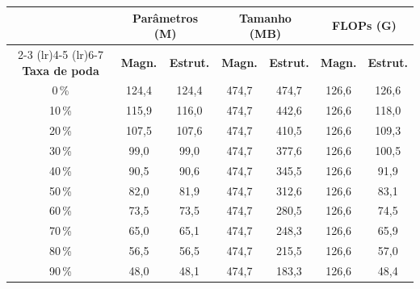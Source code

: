 \begin{tabular}{c cc cc cc}
\toprule
& \multicolumn{2}{c}{\textbf{Parâmetros (M)}} & \multicolumn{2}{c}{\textbf{Tamanho (MB)}} & \multicolumn{2}{c}{\textbf{FLOPs (G)}} \\
\cmidrule(lr){2-3} \cmidrule(lr){4-5} \cmidrule(lr){6-7}
\textbf{Taxa de poda} & \textbf{Magn.} & \textbf{Estrut.} & \textbf{Magn.} & \textbf{Estrut.} & \textbf{Magn.} & \textbf{Estrut.} \\
\midrule
0\,\% & 124,4 & 124,4 & 474,7 & 474,7 & 126,6 & 126,6 \\
10\,\% & 115,9 & 116,0 & 474,7 & 442,6 & 126,6 & 118,0 \\
20\,\% & 107,5 & 107,6 & 474,7 & 410,5 & 126,6 & 109,3 \\
30\,\% & 99,0 & 99,0 & 474,7 & 377,6 & 126,6 & 100,5 \\
40\,\% & 90,5 & 90,6 & 474,7 & 345,5 & 126,6 & 91,9 \\
50\,\% & 82,0 & 81,9 & 474,7 & 312,6 & 126,6 & 83,1 \\
60\,\% & 73,5 & 73,5 & 474,7 & 280,5 & 126,6 & 74,5 \\
70\,\% & 65,0 & 65,1 & 474,7 & 248,3 & 126,6 & 65,9 \\
80\,\% & 56,5 & 56,5 & 474,7 & 215,5 & 126,6 & 57,0 \\
90\,\% & 48,0 & 48,1 & 474,7 & 183,3 & 126,6 & 48,4 \\
\bottomrule
\end{tabular}

